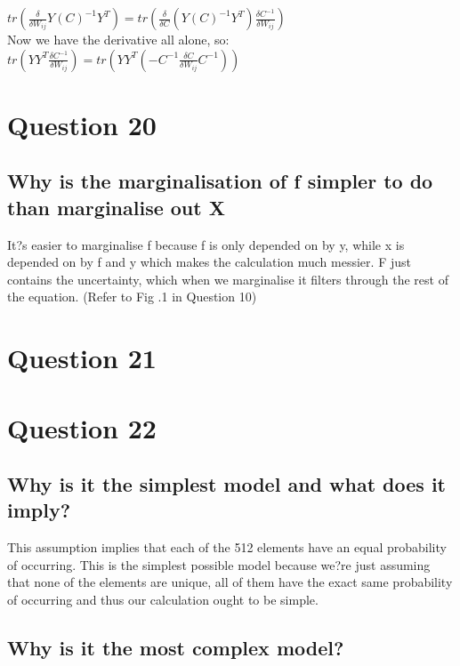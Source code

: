 \documentclass[a4paper, 9pt]{article}
\begin{document}
\( tr(\frac{\delta}{\delta W_{ij}} Y(C)^{-1}Y^T) = tr(\frac{\delta}{\delta C} (Y(C)^{-1}Y^T) \frac{\delta C^{-1}}{\delta W_{ij}} ) \) \\
\newline
Now we have the derivative all alone, so: \\ 

\( tr(Y Y^T \frac{\delta C^{-1}}{\delta W_{ij}}) = tr(Y Y^T ( -C^{-1} \frac{\delta C}{\delta W_{ij}} C^{-1})) \)

\section*{Question 20}
\subsection*{Why is the marginalisation of f simpler to do than marginalise out X}
It?s easier to marginalise f because f is only depended on by y, while x is depended on by f and y which makes the calculation much messier. F just contains the uncertainty, which when we marginalise it filters through the rest of the equation. (Refer to Fig .1 in Question 10)

\section*{Question 21}

\section*{Question 22}
\subsection*{Why is it the simplest model and what does it imply?}
This assumption implies that each of the 512 elements have an equal probability of occurring.
This is the simplest possible model because we?re just assuming that none of the elements are unique, all of them have the exact same probability of occurring and thus our calculation ought to be simple.
\subsection*{Why is it the most complex model?}
\end{document}
